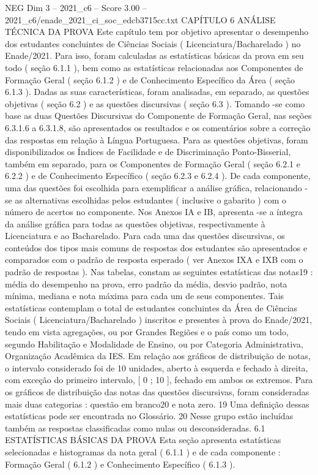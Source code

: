 \begin{textsample}{NEG Dim 3 – 2021\_c6 – Score 3.00 – 2021\_c6/enade\_2021\_ci\_soc\_edcb3715cc.txt}  \label{ex:f3_neg_241}
CAPÍTULO 6 ANÁLISE TÉCNICA DA PROVA Este capítulo tem por objetivo apresentar o desempenho dos estudantes concluintes de Ciências Sociais ( Licenciatura/Bacharelado ) no Enade/2021.
Para isso, foram calculadas as estatísticas básicas da prova em seu todo ( seção 6.1.1 ), bem como as estatísticas relacionadas aos Componentes de Formação Geral ( seção 6.1.2 ) e de Conhecimento Específico da Área ( seção 6.1.3 ).
Dadas as suas características, foram analisadas, em separado, as questões objetivas ( seção 6.2 ) e as questões discursivas ( seção 6.3 ).
Tomando -se como base as duas Questões Discursivas do Componente de Formação Geral, nas seções 6.3.1.6 a 6.3.1.8, são apresentados os resultados e os comentários sobre a correção das respostas em relação à Língua Portuguesa.
Para as questões objetivas, foram disponibilizados os Índices de Facilidade e de Discriminação Ponto-Bisserial, também em separado, para os Componentes de Formação Geral ( seção 6.2.1 e 6.2.2 ) e de Conhecimento Específico ( seção 6.2.3 e 6.2.4 ).
De cada componente, uma das questões foi escolhida para exemplificar a análise gráfica, relacionando -se as alternativas escolhidas pelos estudantes ( inclusive o gabarito ) com o número de acertos no componente.
Nos Anexos IA e IB, apresenta -se a íntegra da análise gráfica para todas as questões objetivas, respectivamente à Licenciatura e ao Bacharelado.
Para cada uma das questões discursivas, os conteúdos dos tipos mais comuns de respostas dos estudantes são apresentados e comparados com o padrão de resposta esperado ( ver Anexos IXA e IXB com o padrão de respostas ).
Nas tabelas, constam as seguintes estatísticas das notas19 : média do desempenho na prova, erro padrão da média, desvio padrão, nota mínima, mediana e nota máxima para cada um de seus componentes.
Tais estatísticas contemplam o total de estudantes concluintes da Área de Ciências Sociais ( Licenciatura/Bacharelado ) inscritos e presentes à prova do Enade/2021, tendo em vista agregações, ou por Grandes Regiões e o país como um todo, segundo Habilitação e Modalidade de Ensino, ou por Categoria Administrativa, Organização Acadêmica da IES.
Em relação aos gráficos de distribuição de notas, o intervalo considerado foi de 10 unidades, aberto à esquerda e fechado à direita, com exceção do primeiro intervalo, [ 0 ; 10 ], fechado em ambos os extremos.
Para os gráficos de distribuição das notas das questões discursivas, foram consideradas mais duas categorias : questão em branco20 e nota zero. 19 Uma definição dessas estatísticas pode ser encontrada no Glossário. 20 Nesse grupo estão incluídas também as respostas classificadas como nulas ou desconsideradas. 6.1 ESTATÍSTICAS BÁSICAS DA PROVA Esta seção apresenta estatísticas selecionadas e histogramas da nota geral ( 6.1.1 ) e de cada componente : Formação Geral ( 6.1.2 ) e Conhecimento Específico ( 6.1.3 ).

\end{textsample}
